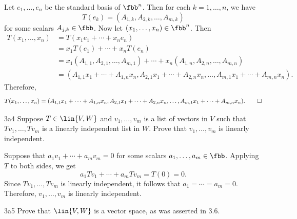 \begin{sol}
    Let $e_1, \ldots, e_n$ be the standard basis of $\fbb^n$.
	Then for each $k = 1, \ldots, n$, we have
    \[
    	T(e_k) = (A_{1, k}, A_{2, k}, \ldots, A_{m, k})
    \]
    for some scalars $A_{j, k} \in \fbb$.
	Now let $(x_1, \ldots, x_n) \in \fbb^n$.
	Then
    \begin{align*}
        T(x_1, \ldots, x_n) & = T(x_1 e_1 + \cdots + x_n e_n) \\
        & = x_1 T(e_1) + \cdots + x_n T(e_n) \\
        & = x_1 (A_{1, 1}, A_{2, 1}, \ldots, A_{m, 1}) + \cdots + x_n (A_{1, n}, A_{2, n}, \ldots, A_{m, n}) \\
        & = (A_{1, 1} x_1 + \cdots + A_{1, n} x_n, A_{2, 1} x_1 + \cdots + A_{2, n} x_n, \ldots, A_{m, 1} x_1 + \cdots + A_{m, n} x_n).
    \end{align*}
    Therefore,
    \[
    	T(x_1, \ldots, x_n) = (A_{1, 1} x_1 + \cdots + A_{1, n} x_n, A_{2, 1} x_1 + \cdots + A_{2, n} x_n, \ldots, A_{m, 1} x_1 + \cdots + A_{m, n} x_n). \qedhere
    \]
\end{sol}

\begin{exercise}{3a4}
    Suppose $T \in \lin{V, W}$ and $v_1, \ldots, v_m$ is a list of vectors in $V$ such that $Tv_1, \ldots, Tv_m$ is a linearly independent list in $W$.
	Prove that $v_1, \ldots, v_m$ is linearly independent.
\end{exercise}

\begin{sol}
    Suppose that $a_1 v_1 + \cdots + a_m v_m = 0$ for some scalars $a_1, \ldots, a_m \in \fbb$.
	Applying $T$ to both sides, we get
    \[
    	a_1 Tv_1 + \cdots + a_m Tv_m = T(0) = 0.
    \]
    Since $Tv_1, \ldots, Tv_m$ is linearly independent, it follows that $a_1 = \cdots = a_m = 0$.
	Therefore, $v_1, \ldots, v_m$ is linearly independent.
\end{sol}

\begin{exercise}{3a5}
    Prove that $\lin{V, W}$ is a vector space, as was asserted in 3.6.
\end{exercise}

